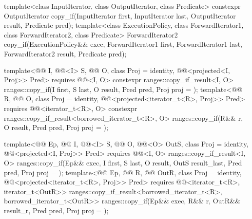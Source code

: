 %
\begin{itemdecl}
template<class InputIterator, class OutputIterator, class Predicate>
  constexpr OutputIterator copy_if(InputIterator first, InputIterator last,
                                   OutputIterator result, Predicate pred);
template<class ExecutionPolicy, class ForwardIterator1, class ForwardIterator2,
         class Predicate>
  ForwardIterator2 copy_if(ExecutionPolicy&& exec,
                           ForwardIterator1 first, ForwardIterator1 last,
                           ForwardIterator2 result, Predicate pred);

template<@@ I, @@<I> S, @@ O, class Proj = identity,
         @@<projected<I, Proj>> Pred>
  requires @@<I, O>
  constexpr ranges::copy_if_result<I, O>
    ranges::copy_if(I first, S last, O result, Pred pred, Proj proj = {});
template<@@ R, @@ O, class Proj = identity,
         @@<projected<iterator_t<R>, Proj>> Pred>
  requires @@<iterator_t<R>, O>
  constexpr ranges::copy_if_result<borrowed_iterator_t<R>, O>
    ranges::copy_if(R&& r, O result, Pred pred, Proj proj = {});

template<@@ Ep, @@ I, @@<I> S,
         @@ O, @@<O> OutS,
         class Proj = identity, @@<projected<I, Proj>> Pred>
  requires @@<I, O>
  ranges::copy_if_result<I, O>
    ranges::copy_if(Ep&& exec, I first, S last, O result, OutS result_last,
                    Pred pred, Proj proj = {});
template<@@ Ep, @@ R, @@ OutR,
         class Proj = identity,
         @@<projected<iterator_t<R>, Proj>> Pred>
  requires @@<iterator_t<R>, iterator_t<OutR>>
  ranges::copy_if_result<borrowed_iterator_t<R>, borrowed_iterator_t<OutR>>
    ranges::copy_if(Ep&& exec, R&& r, OutR&& result_r, Pred pred, Proj proj = {});
\end{itemdecl}


